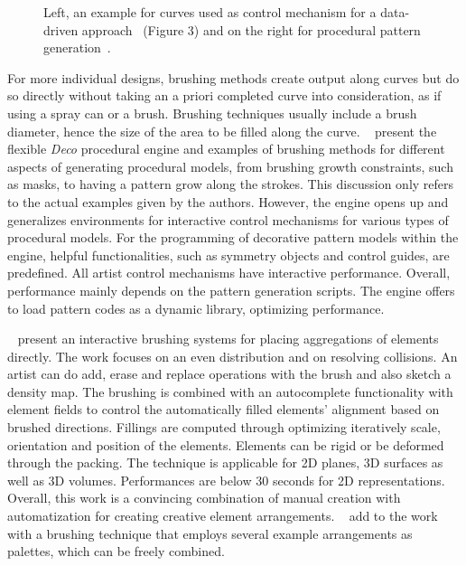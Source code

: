 \begin{figure}[H]
    \centering
    \caption{\label{fig:curves} Left, an example for curves used as control mechanism for a data-driven approach~\cite{lu_2014_dds} (Figure 3) and on the right for procedural pattern generation~\cite{mech_2012_tdf}.}
\end{figure}

For more individual designs, brushing methods create output along curves but do so directly without taking an a priori completed curve into consideration, as if using a spray can or a brush. Brushing techniques usually include a brush diameter, hence the size of the area to be filled along the curve. \citeauthor*{mech_2012_tdf}~\cite{mech_2012_tdf} present the flexible \textit{Deco} procedural engine and examples of brushing methods for different aspects of generating procedural models, from brushing growth constraints, such as masks, to having a pattern grow along the strokes. This discussion only refers to the actual examples given by the authors. However, the engine opens up and generalizes environments for interactive control mechanisms for various types of procedural models. For the programming of decorative pattern models within the engine, helpful functionalities, such as symmetry objects and control guides, are predefined. All artist control mechanisms have interactive performance. Overall, performance mainly depends on the pattern generation scripts. The engine offers to load pattern codes as a dynamic library, optimizing performance. 

 \citeauthor*{hsu_2020_aef}~\cite{hsu_2020_aef} present an interactive brushing systems for placing aggregations of elements directly. The work focuses on an even distribution and on resolving collisions. An artist can do add, erase and replace operations with the brush and also sketch a density map. The brushing is combined with an autocomplete functionality with element fields to control the automatically filled elements' alignment based on brushed directions. Fillings are computed through optimizing iteratively scale, orientation and position of the elements. Elements can be rigid or be deformed through the packing. The technique is applicable for 2D planes, 3D surfaces as well as 3D volumes. Performances are below 30 seconds for 2D representations. Overall, this work is a convincing combination of manual creation with automatization for creating creative element arrangements. \citeauthor*{davison_2019_ief}~\cite{davison_2019_ief} add to the work with a brushing technique that employs several example arrangements as palettes, which can be freely combined. 

